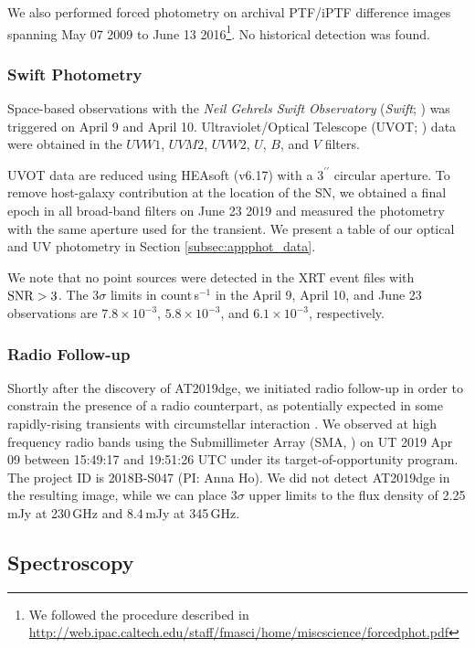 \documentclass[twocolumn]{aastex63}
\begin{document}
\begin{CJK*}{UTF8}{gbsn}
We also performed forced photometry on archival PTF/iPTF difference images spanning May 07 2009 to 
June 13 2016\footnote{We followed the procedure described in 
	\url{http://web.ipac.caltech.edu/staff/fmasci/home/miscscience/forcedphot.pdf}}. No historical 
detection was found. 
\subsubsection{Swift Photometry}
Space-based observations with the \textit{Neil Gehrels Swift Observatory} (\textit{Swift}; 
\citealt{Gehrels2004}) was triggered on April 9 and April 10. Ultraviolet/Optical Telescope (UVOT; 
\citealt{Roming2005}) data were obtained in the $UVW1$, $UVM2$, $UVW2$, $U$, $B$, and $V$ 
filters. 

UVOT data are reduced using HEAsoft (v6.17) with a $3^{\prime\prime}$ circular aperture. To remove 
host-galaxy contribution at the location of the SN, we obtained a final epoch in all broad-band filters 
on June 23 2019 and measured the photometry with the same aperture used for the transient. We 
present a table of our optical and UV photometry in Section \ref{subsec:appphot_data}.

We note that no point sources were detected in the XRT event files with $\rm{SNR}>3$.
The 3$\sigma$ limits in count\,s$^{-1}$ in the April 9, April 10, and June 23 observations are $7.8\times 
10^{-3}$,  $5.8\times 10^{-3}$, and $6.1\times 10^{-3}$, respectively.

\subsubsection{Radio Follow-up}
Shortly after the discovery of AT2019dge, we initiated radio follow-up in order to constrain the 
presence of a radio counterpart, as potentially expected in some rapidly-rising transients with 
circumstellar interaction \citep{HoPhinney2019}. We observed at high frequency radio bands using the 
Submillimeter Array (SMA, \citealt{Ho2004}) on UT 2019 Apr 09 between 15:49:17 and 19:51:26 UTC 
under its target-of-opportunity program. The 
project ID is 2018B-S047 (PI: Anna Ho). We did not detect AT2019dge in the resulting image, while we 
can place 3$\sigma$ upper limits to the flux density of 2.25\,mJy at 230\,GHz and 8.4\,mJy at 
345\,GHz. 

\subsection{Spectroscopy}


\end{CJK*}
\end{document}
